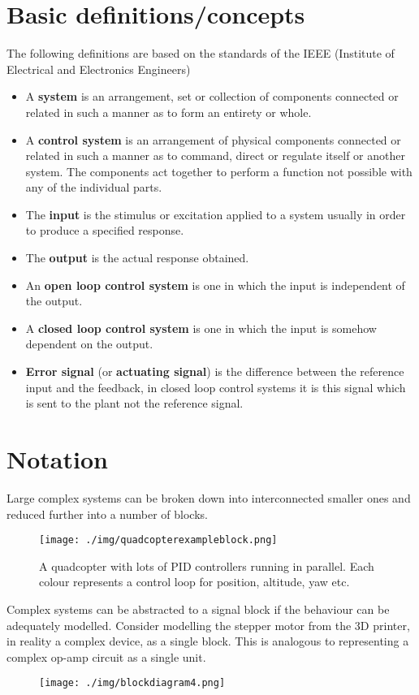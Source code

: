 \section{Basic definitions/concepts}
The following definitions are based on the standards of the IEEE (Institute of Electrical and Electronics Engineers)
\begin{itemize}
  \item A \textbf{system} is an arrangement, set or collection of components connected or related in such a manner as to form an entirety or whole.
  \item A \textbf{control system} is an arrangement of physical components connected or related in such a manner as to command, direct or regulate itself or another system. The components act together to perform a function not possible with any of the individual parts.
  \item The \textbf{input} is the stimulus or excitation applied to a system usually in order to produce a specified response.
  \item The \textbf{output} is the actual response obtained.
  \item An \textbf{open loop control system} is one in which the input is independent of the output.
  \item A \textbf{closed loop control system} is one in which the input is somehow dependent on the output.
  \item \textbf{Error signal} (or \textbf{actuating signal}) is the difference between the reference input and the feedback, in closed loop control systems it is this signal which is sent to the plant not the reference signal.
\end{itemize}
\section{Notation}
Large complex systems can be broken down into interconnected smaller ones and reduced further into a number of blocks.
\begin{figure}[H]
  \centering
  \texttt{[image: ./img/quadcopterexampleblock.png]}
  \caption{A quadcopter with lots of PID controllers running in parallel. Each colour represents a control loop for position, altitude, yaw etc.}
\end{figure}
Complex systems can be abstracted to a signal block if the behaviour can be adequately modelled. Consider modelling the stepper motor from the 3D printer, in reality a complex device, as a single block. This is analogous to representing a complex op-amp circuit as a single unit.
\begin{figure}[H]
  \centering
  \texttt{[image: ./img/blockdiagram4.png]}
\end{figure}

